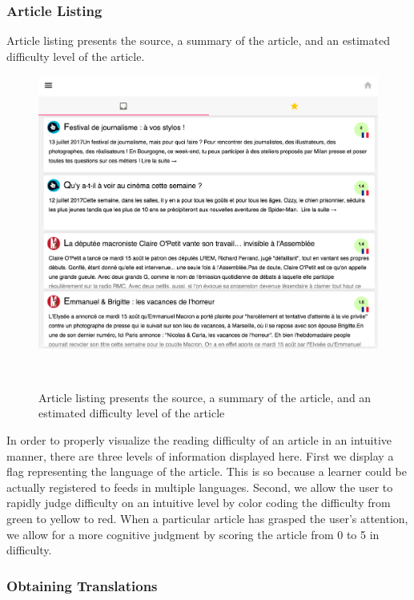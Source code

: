 \subsubsection{Article Listing}

Article listing presents the source, a summary of the article, and an estimated difficulty level of the article.

    \begin{figure}[h!]
    \centering
      \includegraphics[width=0.8\columnwidth]{figures/article_listing}
      \caption{Article listing presents the source, a summary of the article, and an estimated difficulty level of the article }~
      \label{fig:registrations}
    \end{figure}


In order to properly visualize the reading difficulty of an article in an intuitive manner, there are three levels of information displayed here. First we display a flag representing the language of the article. This is so because a learner could be actually registered to feeds in multiple languages. Second, we allow the user to rapidly judge difficulty on an intuitive level by color coding the difficulty from green to yellow to red. When a particular article has grasped the user's attention, we allow for a more cognitive judgment by scoring the article from 0 to 5 in difficulty.




\subsubsection{Obtaining Translations}

